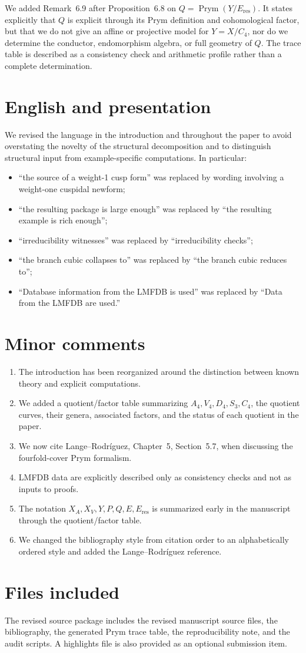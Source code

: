 \documentclass[11pt,letterpaper]{article}
\newcommand{\Prym}{\operatorname{Prym}}
\begin{document}
We added Remark~6.9 after Proposition~6.8 on \(Q=\Prym(Y/E_{\mathrm{res}})\). It states explicitly that \(Q\) is explicit through its Prym definition and cohomological factor, but that we do not give an affine or projective model for \(Y=X/C_4\), nor do we determine the conductor, endomorphism algebra, or full geometry of \(Q\). The trace table is described as a consistency check and arithmetic profile rather than a complete determination.

\section*{English and presentation}

We revised the language in the introduction and throughout the paper to avoid overstating the novelty of the structural decomposition and to distinguish structural input from example-specific computations. In particular:
\begin{itemize}
\item ``the source of a weight-1 cusp form'' was replaced by wording involving a weight-one cuspidal newform;
\item ``the resulting package is large enough'' was replaced by ``the resulting example is rich enough'';
\item ``irreducibility witnesses'' was replaced by ``irreducibility checks'';
\item ``the branch cubic collapses to'' was replaced by ``the branch cubic reduces to'';
\item ``Database information from the LMFDB is used'' was replaced by ``Data from the LMFDB are used.''
\end{itemize}

\section*{Minor comments}

\begin{enumerate}
\item The introduction has been reorganized around the distinction between known theory and explicit computations.
\item We added a quotient/factor table summarizing \(A_4,V_4,D_4,S_3,C_4\), the quotient curves, their genera, associated factors, and the status of each quotient in the paper.
\item We now cite Lange--Rodr{\'i}guez, Chapter~5, Section~5.7, when discussing the fourfold-cover Prym formalism.
\item LMFDB data are explicitly described only as consistency checks and not as inputs to proofs.
\item The notation \(X_A,X_V,Y,P,Q,E,E_{\mathrm{res}}\) is summarized early in the manuscript through the quotient/factor table.
\item We changed the bibliography style from citation order to an alphabetically ordered style and added the Lange--Rodr{\'i}guez reference.
\end{enumerate}

\section*{Files included}

The revised source package includes the revised manuscript source files, the bibliography, the generated Prym trace table, the reproducibility note, and the audit scripts. A highlights file is also provided as an optional submission item.
\end{document}
